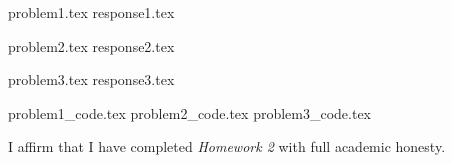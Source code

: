 \documentclass[letterpaper, 12pt]{article}
\begin{document}

{problem1.tex}
{response1.tex}

{problem2.tex}
{response2.tex}

{problem3.tex}
{response3.tex}

\appendix

{problem1_code.tex}
{problem2_code.tex}
{problem3_code.tex}

\par

I affirm that I have completed \textit{Homework 2} with full academic honesty.
\end{document}
